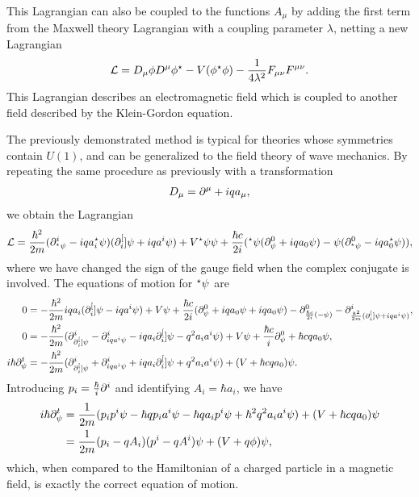 This Lagrangian can also be coupled to the functions $A_{\mu}$ by adding the first term from the Maxwell theory Lagrangian with a coupling parameter $\lambda$, netting a new Lagrangian
\begin{align*}
	\mathcal{L} = D_{\mu}\phi D^{\mu}\phi^{\star} - V(\phi^{\star}\phi) - \frac{1}{4\lambda^{2}}F_{\mu\nu}F^{\mu\nu}.
\end{align*}
This Lagrangian describes an electromagnetic field which is coupled to another field described by the Klein-Gordon equation.

The previously demonstrated method is typical for theories whose symmetries contain $U(1)$, and can be generalized to the field theory of wave mechanics. By repeating the same procedure as previously with a transformation
\begin{align*}
	D_{\mu} = \partial^{\mu}_{} + iqa_{\mu},
\end{align*}
we obtain the Lagrangian
\begin{align*}
	\mathcal{L} = \frac{\hbar^{2}}{2m}(\partial^{i}_{^{\star}{\psi}} - iqa_{i}^{\star}{\psi})(\partial^{[}_{i}]{}{\psi} + iqa^{i}\psi) + V^{\star}{\psi}\psi + \frac{\hbar c}{2i}(^{\star}{\psi}(\partial^{0}_{\psi} + iqa_{0}\psi) - \psi(\partial^{0}_{^{\star}{\psi}} - iqa_{0}^{\star}{\psi})),
\end{align*}
where we have changed the sign of the gauge field when the complex conjugate is involved. The equations of motion for $^{\star}{\psi}$ are
\begin{align*}
	0 &= -\frac{\hbar^{2}}{2m}iqa_{i}(\partial^{[}_{i}]{}{\psi} - iqa^{i}\psi) + V\psi + \frac{\hbar c}{2i}(\partial^{0}_{\psi} + iqa_{0}\psi + iqa_{0}\psi) - \partial^{0}_{\frac{\hbar c}{2i}( - \psi)} - \partial^{i}_{\frac{\hbar^{2}}{2m}(\partial^{[}_{i}]{}{\psi} + iqa^{i}\psi)}, \\
	0 &= -\frac{\hbar^{2}}{2m}(\partial^{i}_{\partial^{[}_{i}]{}{\psi}} - \partial^{i}_{iqa^{i}\psi} - iqa_{i}\partial^{[}_{i}]{}{\psi} - q^{2}a_{i}a^{i}\psi) + V\psi + \frac{\hbar c}{i}\partial^{0}_{\psi} + \hbar cqa_{0}\psi, \\
	i\hbar\partial^{t}_{\psi} &= -\frac{\hbar^{2}}{2m}(\partial^{i}_{\partial^{[}_{i}]{}{\psi}} + \partial^{i}_{iqa^{i}\psi} + iqa_{i}\partial^{[}_{i}]{}{\psi} + q^{2}a_{i}a^{i}\psi) + (V + \hbar cqa_{0})\psi.
\end{align*}
Introducing $p_{i} = \frac{\hbar}{i}\partial^{i}_{}$ and identifying $A_{i} = \hbar a_{i}$, we have
\begin{align*}
	i\hbar\partial^{t}_{\psi} &= \frac{1}{2m}(p_{i}p^{i}\psi - \hbar qp_{i}a^{i}\psi - \hbar qa_{i}p^{i}\psi + \hbar^{2}q^{2}a_{i}a^{i}\psi) + (V + \hbar cqa_{0})\psi \\
	                    &= \frac{1}{2m}(p_{i} - qA_{i})(p^{i} - qA^{i})\psi + (V + q\phi)\psi,
\end{align*}
which, when compared to the Hamiltonian of a charged particle in a magnetic field, is exactly the correct equation of motion.

